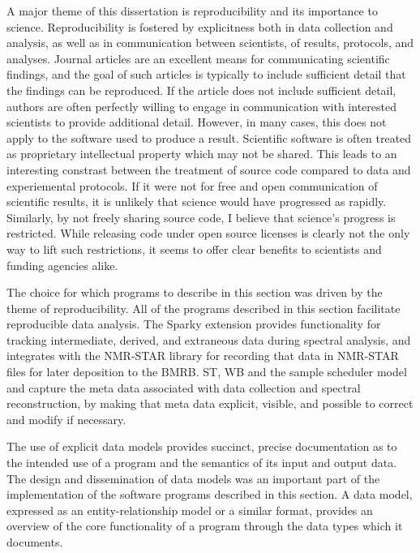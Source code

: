 A major theme of this dissertation is reproducibility and its importance to
science.  Reproducibility is fostered by explicitness both in data collection
and analysis, as well as in communication between scientists, of results, 
protocols, and analyses.  Journal articles are an excellent means for 
communicating scientific findings, and the goal of such articles is typically
to include sufficient detail that the findings can be reproduced.  If the
article does not include sufficient detail, authors are often perfectly willing
to engage in communication with interested scientists to provide additional
detail.  However, in many cases, this does not apply to the software used to
produce a result.  Scientific software is often treated as proprietary 
intellectual property which may not be shared.  This leads to an interesting
constrast between the treatment of source code compared to data and experiemental
protocols.  If it were not for free and open communication of scientific results,
it is unlikely that science would have progressed as rapidly.  Similarly, by not
freely sharing source code, I believe that science's progress is restricted. 
While releasing code under open source licenses is clearly not the only way to
lift such restrictions, it seems to offer clear benefits to scientists and
funding agencies alike.

The choice for which programs to describe in this section was driven by the
theme of reproducibility.  All of the programs described in this section 
facilitate reproducible data analysis.  The Sparky extension
provides functionality for tracking intermediate, derived, and extraneous data
during spectral analysis, and integrates with the NMR-STAR library for recording
that data in NMR-STAR files for later deposition to the BMRB.  
ST, WB and the sample scheduler model and capture the meta data associated with 
data collection and spectral reconstruction, by making that meta data explicit,
visible, and possible to correct and modify if necessary.

The use of explicit data models provides succinct, precise documentation as to
the intended use of a program and the semantics of its input and output data.
The design and dissemination of data models was an important part of the
implementation of the software programs described in this section.  A data 
model, expressed as an entity-relationship model or a similar format, 
provides an overview of the core functionality of a program through the data 
types which it documents.

